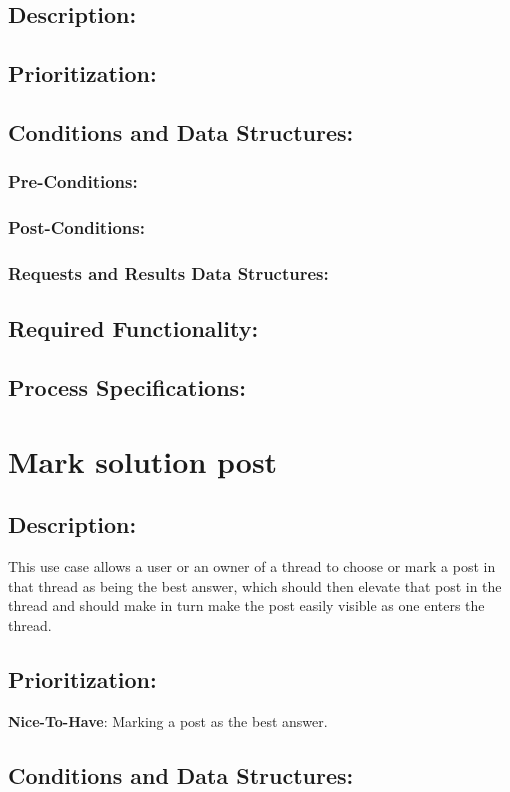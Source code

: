 \documentclass[a4paper,11pt]{article}
\begin{document}
\subsection*{Description:}
\subsection{Prioritization:} 
\subsection{Conditions and Data Structures:}
\subsubsection*{Pre-Conditions:}
\subsubsection*{Post-Conditions:}
\subsubsection*{Requests and Results Data Structures:}
\subsection{Required Functionality:} 
\subsection{Process Specifications:} 

\section{Mark solution post}
\subsection*{Description:}
This use case allows a user or an owner of a thread to choose or mark a post in that thread as being the best answer, which should then elevate that post in the thread and should make in turn make the post easily visible as one enters the thread.
\subsection{Prioritization:} 
\textbf{Nice-To-Have}: Marking a post as the best answer.
\subsection{Conditions and Data Structures:}
\end{document}
